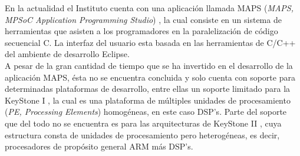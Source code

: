 En la actualidad el Instituto cuenta con una aplicación llamada MAPS (\textit{MAPS, MPSoC Application Programming Studio}) \cite{MAPS1}, la cual
consiste en un sistema de herramientas que asisten a los programadores en la paralelización de código secuencial C. La interfaz del usuario
esta basada en las herramientas de C/C++ del ambiente de desarrollo Eclipse.\\

A pesar de la gran cantidad de tiempo que se ha invertido en el desarrollo de la aplicación MAPS, ésta no se encuentra concluida y solo 
cuenta con soporte para determinadas plataformas de desarrollo, entre ellas un soporte limitado para la KeyStone I \cite{KSI1}, la cual es
una plataforma de múltiples unidades de procesamiento (\textit{PE, Processing Elements}) homogéneas, en este caso DSP's. Parte del soporte 
que del todo no se encuentra es para las arquitecturas de KeyStone II \cite{KSII1}, cuya estructura consta de unidades de procesamiento 
pero heterogéneas, es decir, procesadores de propósito general ARM más DSP's.


